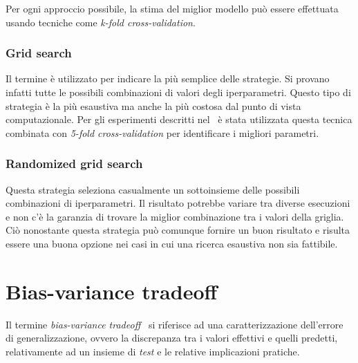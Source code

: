Per ogni approccio possibile, la stima del miglior modello può essere effettuata usando tecniche come \emph{k-fold cross-validation}.

\subsubsection{Grid search}
Il termine è utilizzato per indicare la più semplice delle strategie. Si provano infatti tutte le possibili combinazioni di valori degli iperparametri. 
Questo tipo di strategia è la più esaustiva ma anche la più costosa dal punto di vista computazionale.
Per gli esperimenti descritti nel~ è stata utilizzata questa tecnica combinata con \emph{5-fold cross-validation} per identificare i migliori parametri.
\subsubsection{Randomized grid search}
Questa strategia seleziona casualmente un sottoinsieme delle possibili combinazioni di iperparametri. 
Il risultato potrebbe variare tra diverse esecuzioni e non c'è la garanzia di trovare la miglior combinazione tra i valori della griglia.
Ciò nonostante questa strategia può comunque fornire un buon risultato e risulta essere una buona opzione nei casi in cui una ricerca esaustiva non sia fattibile. 

\section{Bias-variance tradeoff}\label{sec:bias_variance_tradeoff}
Il termine \emph{bias-variance tradeoff}~\cite{elements-of-statistical-learning} si riferisce ad una caratterizzazione dell'errore di generalizzazione, ovvero la discrepanza tra i valori effettivi e quelli predetti, relativamente ad un insieme di \emph{test} e le relative implicazioni pratiche.

